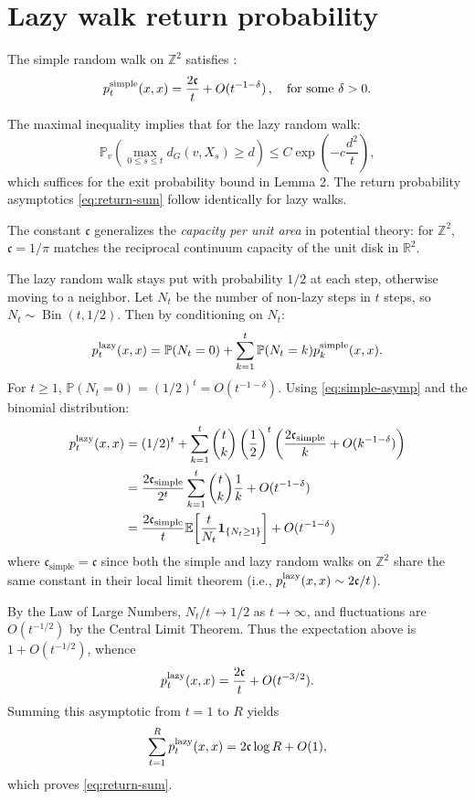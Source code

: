 \documentclass[11pt]{amsart}
\theoremstyle{remark}
\newcommand{\cG}{\mathfrak{c}}      %
\begin{document}
\section{Lazy walk return probability}\label{app:return}
The simple random walk on $\mathbb{Z}^2$ satisfies \cite{LyonsPeres16}:
\begin{equation}\label{eq:simple-asymp}
  p_t^{\textnormal{simple}}(x,x) = \frac{2\cG}{t} + O(t^{-1-\delta})\,,\quad \text{for some } \delta>0.
\end{equation}


The maximal inequality \cite[Corollary 3.3]{Delmotte99} implies that for the lazy random walk:
\[
\mathbb{P}_v\!\left( \max_{0 \le s \le t} d_G(v, X_s) \ge d \right) \le C \exp\left( -c \frac{d^2}{t} \right),
\]
which suffices for the exit probability bound in Lemma 2. The return probability asymptotics \eqref{eq:return-sum} follow identically for lazy walks.
 
The constant $\cG$ generalizes the \emph{capacity per unit area} in potential theory: 
for $\mathbb{Z}^2$, $\cG = 1/\pi$ matches the reciprocal continuum capacity of the unit disk in $\mathbb{R}^2$.

The lazy random walk stays put with probability $1/2$ at each step, otherwise moving to a neighbor. Let $N_t$ be the number of non-lazy steps in $t$ steps, so $N_t \sim \operatorname{Bin}(t,1/2)$. Then by conditioning on $N_t$:
\[
  p_t^{\textnormal{lazy}}(x,x) = \mathbb{P}(N_t=0) + \sum_{k=1}^t \mathbb{P}(N_t=k) p_k^{\textnormal{simple}}(x,x).
\]
For $t \ge 1$, $\mathbb{P}(N_t = 0) = (1/2)^t = O(t^{-1-\delta})$. Using \eqref{eq:simple-asymp} and the binomial distribution:
\begin{align*}
  p_t^{\textnormal{lazy}}(x,x) 
  &= (1/2)^t + \sum_{k=1}^t \binom{t}{k} \left(\frac{1}{2}\right)^t \left( \frac{2\cG_{\text{simple}}}{k} + O(k^{-1-\delta}) \right) \\
  &= \frac{2\cG_{\text{simple}}}{2^t} \sum_{k=1}^t \binom{t}{k} \frac{1}{k} + O(t^{-1-\delta}) \\
  &= \frac{2\cG_{\text{simple}}}{t} \mathbb{E}\!\left[ \frac{t}{N_t} \mathbf{1}_{\{N_t \geq 1\}} \right] + O(t^{-1-\delta})
\end{align*}
where $\cG_{\text{simple}} = \cG$ since both the simple and lazy random walks on $\mathbb{Z}^2$ share the same constant in their local limit theorem (i.e., $p_t^{\textnormal{lazy}}(x,x) \sim 2\cG/t$).

By the Law of Large Numbers, $N_t/t \to 1/2$ as $t\to\infty$, and fluctuations are $O(t^{-1/2})$ by the Central Limit Theorem. Thus the expectation above is $1+O(t^{-1/2})$, whence
\[
  p_t^{\textnormal{lazy}}(x,x) = \frac{2\cG}{t} + O(t^{-3/2}).
\]
Summing this asymptotic from $t=1$ to $R$ yields
\[
  \sum_{t=1}^R p_t^{\textnormal{lazy}}(x,x) = 2\cG \log R + O(1),
\]
which proves \eqref{eq:return-sum}.
\end{document}
